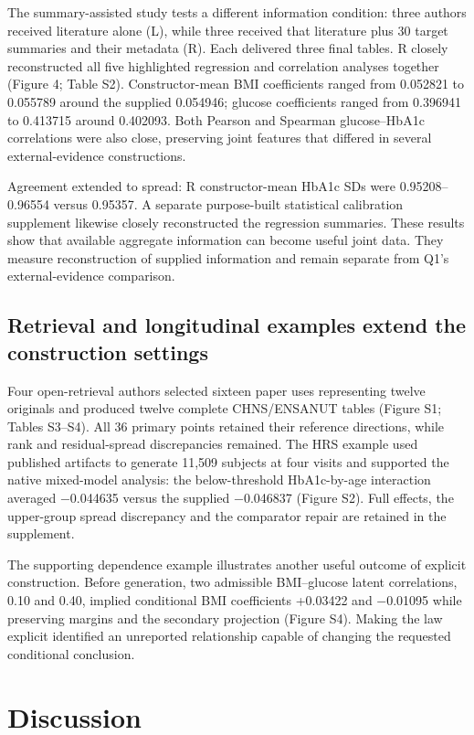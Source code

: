 \documentclass[10pt,twocolumn]{article}
\begin{document}
The summary-assisted study tests a different information condition: three authors received literature alone (L), while three received that literature plus 30 target summaries and their metadata (R). Each delivered three final tables. R closely reconstructed all five highlighted regression and correlation analyses together (Figure 4; Table S2). Constructor-mean BMI coefficients ranged from 0.052821 to 0.055789 around the supplied 0.054946; glucose coefficients ranged from 0.396941 to 0.413715 around 0.402093. Both Pearson and Spearman glucose–HbA1c correlations were also close, preserving joint features that differed in several external-evidence constructions.


Agreement extended to spread: R constructor-mean HbA1c SDs were 0.95208–0.96554 versus 0.95357. A separate purpose-built statistical calibration supplement likewise closely reconstructed the regression summaries. These results show that available aggregate information can become useful joint data. They measure reconstruction of supplied information and remain separate from Q1's external-evidence comparison.


\subsection{Retrieval and longitudinal examples extend the construction settings}

Four open-retrieval authors selected sixteen paper uses representing twelve originals and produced twelve complete CHNS/ENSANUT tables (Figure S1; Tables S3–S4). All 36 primary points retained their reference directions, while rank and residual-spread discrepancies remained. The HRS example used published artifacts to generate 11,509 subjects at four visits and supported the native mixed-model analysis: the below-threshold HbA1c-by-age interaction averaged −0.044635 versus the supplied −0.046837 (Figure S2). Full effects, the upper-group spread discrepancy and the comparator repair are retained in the supplement.


The supporting dependence example illustrates another useful outcome of explicit construction. Before generation, two admissible BMI–glucose latent correlations, 0.10 and 0.40, implied conditional BMI coefficients +0.03422 and −0.01095 while preserving margins and the secondary projection (Figure S4). Making the law explicit identified an unreported relationship capable of changing the requested conditional conclusion.


\section{Discussion}
\end{document}
